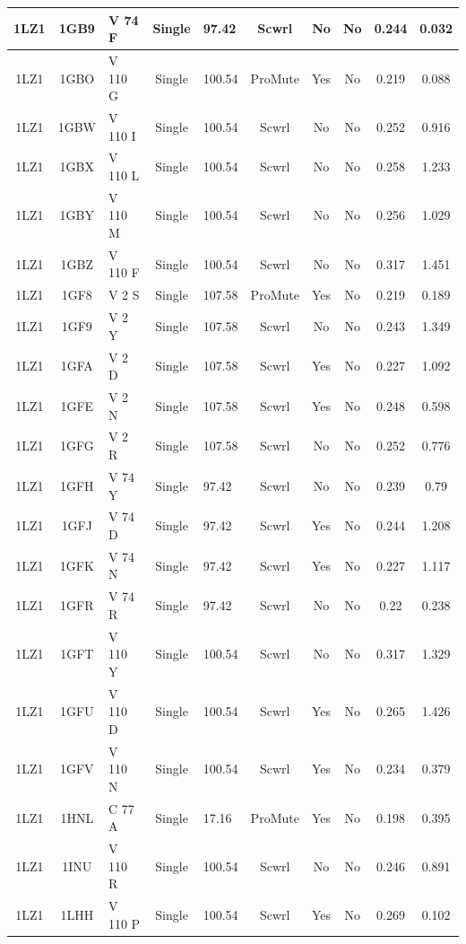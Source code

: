 \documentclass[sigconf]{acmart}
\begin{document}
\begin{table}[h]
{\begin{tabular}{|c|c|p{2.8cm}|c|p{2.8cm}|c|c|c|c|c|}
		1LZ1 & 1GB9 & V 74 F & Single & 97.42 & Scwrl & No & No & 0.244 & 0.032 \\ \hline
		1LZ1 & 1GBO & V 110 G & Single & 100.54 & ProMute & Yes & No & 0.219 & 0.088 \\ \hline
		1LZ1 & 1GBW & V 110 I & Single & 100.54 & Scwrl & No & No & 0.252 & 0.916 \\ \hline
		1LZ1 & 1GBX & V 110 L & Single & 100.54 & Scwrl & No & No & 0.258 & 1.233 \\ \hline
		1LZ1 & 1GBY & V 110 M & Single & 100.54 & Scwrl & No & No & 0.256 & 1.029 \\ \hline
		1LZ1 & 1GBZ & V 110 F & Single & 100.54 & Scwrl & No & No & 0.317 & 1.451 \\ \hline
		1LZ1 & 1GF8 & V 2 S & Single & 107.58 & ProMute & Yes & No & 0.219 & 0.189 \\ \hline
		1LZ1 & 1GF9 & V 2 Y & Single & 107.58 & Scwrl & No & No & 0.243 & 1.349 \\ \hline
		1LZ1 & 1GFA & V 2 D & Single & 107.58 & Scwrl & Yes & No & 0.227 & 1.092 \\ \hline
		1LZ1 & 1GFE & V 2 N & Single & 107.58 & Scwrl & Yes & No & 0.248 & 0.598 \\ \hline
		1LZ1 & 1GFG & V 2 R & Single & 107.58 & Scwrl & No & No & 0.252 & 0.776 \\ \hline
		1LZ1 & 1GFH & V 74 Y & Single & 97.42 & Scwrl & No & No & 0.239 & 0.79 \\ \hline
		1LZ1 & 1GFJ & V 74 D & Single & 97.42 & Scwrl & Yes & No & 0.244 & 1.208 \\ \hline
		1LZ1 & 1GFK & V 74 N & Single & 97.42 & Scwrl & Yes & No & 0.227 & 1.117 \\ \hline
		1LZ1 & 1GFR & V 74 R & Single & 97.42 & Scwrl & No & No & 0.22 & 0.238 \\ \hline
		1LZ1 & 1GFT & V 110 Y & Single & 100.54 & Scwrl & No & No & 0.317 & 1.329 \\ \hline
		1LZ1 & 1GFU & V 110 D & Single & 100.54 & Scwrl & Yes & No & 0.265 & 1.426 \\ \hline
		1LZ1 & 1GFV & V 110 N & Single & 100.54 & Scwrl & Yes & No & 0.234 & 0.379 \\ \hline
		1LZ1 & 1HNL & C 77 A & Single & 17.16 & ProMute & Yes & No & 0.198 & 0.395 \\ \hline
		1LZ1 & 1INU & V 110 R & Single & 100.54 & Scwrl & No & No & 0.246 & 0.891 \\ \hline
		1LZ1 & 1LHH & V 110 P & Single & 100.54 & Scwrl & Yes & No & 0.269 & 0.102 \\ \hline

\end{tabular}}
\end{table}
\end{document}
